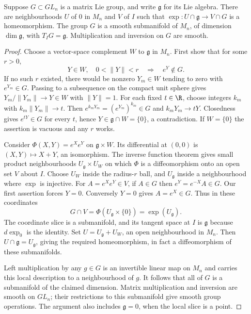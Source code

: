 \begin{theorem}\label{thm:closedsubgroup}
Suppose $G\subset GL_n$ is a matrix Lie group, and write $\mathfrak g$ for its Lie algebra.
There are neighbourhoods $U$ of $0$ in $M_n$ and $V$ of $I$ such that
$\exp:U\cap\mathfrak g\to V\cap G$ is a homeomorphism.
The group $G$ is a smooth submanifold of $M_n$, of dimension
$\dim\mathfrak g$, with $T_IG=\mathfrak g$. Multiplication and inversion
on $G$ are smooth.
\end{theorem}
\begin{proof}
Choose a vector-space complement $W$ to $\mathfrak g$ in $M_n$.
First show that for some $r>0$,
\[
 Y\in W,\quad0<\|Y\|<r\quad\Longrightarrow\quad e^Y\notin G.
\]
If no such $r$ existed, there would be nonzero $Y_m\in W$ tending to
zero with $e^{Y_m}\in G$. Passing to a subsequence on the compact unit
sphere gives $Y_m/\|Y_m\|\to Y\in W$ with $\|Y\|=1$.
For each fixed $t\in\R$, choose integers $k_m$ with
$k_m\|Y_m\|\to t$. Then
$e^{k_mY_m}=(e^{Y_m})^{k_m}\in G$ and $k_mY_m\to tY$.
Closedness gives $e^{tY}\in G$ for every $t$, hence
$Y\in\mathfrak g\cap W=\{0\}$, a contradiction.
If $W=\{0\}$ the assertion is vacuous and any $r$ works.

Consider $\Phi(X,Y)=e^Xe^Y$ on $\mathfrak g\times W$.
Its differential at $(0,0)$ is $(X,Y)\mapsto X+Y$, an isomorphism.
The inverse function theorem gives small product neighbourhoods
$U_{\mathfrak g}\times U_W$ on which $\Phi$ is a diffeomorphism onto
an open set $V$ about $I$. Choose $U_W$ inside the radius-$r$ ball,
and $U_{\mathfrak g}$ inside a neighbourhood where $\exp$ is injective.
For $A=e^Xe^Y\in V$, if $A\in G$ then
$e^Y=e^{-X}A\in G$. Our first assertion forces $Y=0$.
Conversely $Y=0$ gives $A=e^X\in G$.
Thus in these coordinates
\[
 G\cap V=\Phi(U_{\mathfrak g}\times\{0\})=\exp(U_{\mathfrak g}).
\]
The coordinate slice is a submanifold, and its tangent space at $I$ is
$\mathfrak g$ because $d\exp_0$ is the identity.
Set $U=U_{\mathfrak g}+U_W$, an open neighbourhood in $M_n$.
Then $U\cap\mathfrak g=U_{\mathfrak g}$, giving the required
homeomorphism, in fact a diffeomorphism of these submanifolds.

Left multiplication by any $g\in G$ is an invertible linear map on
$M_n$ and carries this local description to a neighbourhood of $g$.
It follows that all of $G$ is a submanifold of the claimed dimension.
Matrix multiplication and inversion are smooth on $GL_n$;
their restrictions to this submanifold give smooth group operations.
The argument also includes $\mathfrak g=0$, when the local slice is a point.
\end{proof}

